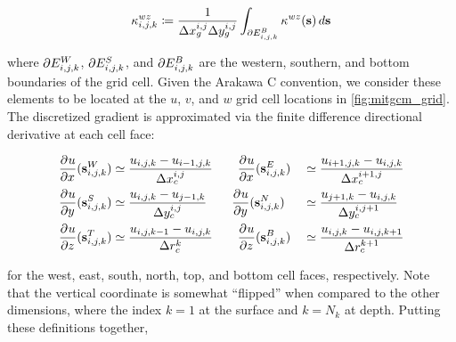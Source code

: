 \begin{linenomath*}\begin{equation*}
    \kappa^{wz}_{{i,j,k}} \coloneqq \dfrac{1}{\Delta x_g^{i,j}\Delta y_g^{i,j}}
    \int_{\partial E_{{i,j,k}}^{B}} \kappa^{wz}(\mathbf{s})\,d\mathbf{s}
\end{equation*}\end{linenomath*}
where $\partial E_{{i,j,k}}^{W}$, $\partial E_{{i,j,k}}^{S}$, and $\partial E_{{i,j,k}}^{B}$ are the
western, southern, and bottom boundaries of the grid cell.
Given the Arakawa C convention, we consider these elements to be
located at the $u$, $v$, and $w$ grid cell locations in \cref{fig:mitgcm_grid}.
The discretized gradient is approximated via the finite difference
directional derivative at each cell face:
\begin{linenomath*}\begin{equation*}
    \begin{aligned}
        \frac{\partial^{} {u}}{\partial {x}^{}}(\mathbf{s}_{i,j,k}^W)
        &\simeq \dfrac{u_{i,j,k} - u_{i-1,j,k}}{\Delta x_c^{i,j}}
        \qquad
        \frac{\partial^{} {u}}{\partial {x}^{}}(\mathbf{s}_{i,j,k}^E)
        &&\simeq \dfrac{u_{i+1,j,k} - u_{i,j,k}}{\Delta x_c^{i+1,j}}
        \\
        \frac{\partial^{} {u}}{\partial {y}^{}}(\mathbf{s}_{i,j,k}^S)
        &\simeq \dfrac{u_{i,j,k} - u_{j-1,k}}{\Delta y_c^{i,j}}
        \qquad
        \frac{\partial^{} {u}}{\partial {y}^{}}(\mathbf{s}_{i,j,k}^N)
        &&\simeq \dfrac{u_{j+1,k} - u_{i,j,k}}{\Delta y_c^{i,j+1}}
        \\
        \frac{\partial^{} {u}}{\partial {z}^{}}(\mathbf{s}_{i,j,k}^T)
        &\simeq \dfrac{u_{i,j,k-1} - u_{i,j,k}}{\Delta r_c^{k}}
        \qquad
        \frac{\partial^{} {u}}{\partial {z}^{}}(\mathbf{s}_{i,j,k}^B)
        &&\simeq \dfrac{u_{i,j,k} - u_{i,j,k+1}}{\Delta r_c^{k+1}}
    \end{aligned}
\end{equation*}\end{linenomath*}
for the west, east, south, north, top, and bottom cell faces, respectively.
Note that the vertical coordinate is somewhat ``flipped'' when compared to the
other dimensions, where the index $k=1$ at the surface and $k=N_k$ at depth.
Putting these definitions together,
